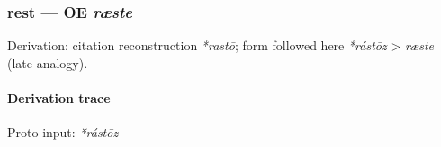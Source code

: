 \documentclass[
  british,
  a4paper,
]{article}
\begin{document}
\subsubsection{\texorpdfstring{rest --- OE
\emph{ræste}}{rest --- OE ræste}}\label{rest-oe-ruxe6ste}

Derivation: citation reconstruction \emph{*rastō}; form followed here
\emph{*rástōz} \textgreater{} \emph{ræste} (late analogy).

\paragraph{Derivation trace}\label{derivation-trace-135}

Proto input: \emph{*rástōz}

\begingroup
\setlength{\fboxsep}{6pt}
\end{document}
